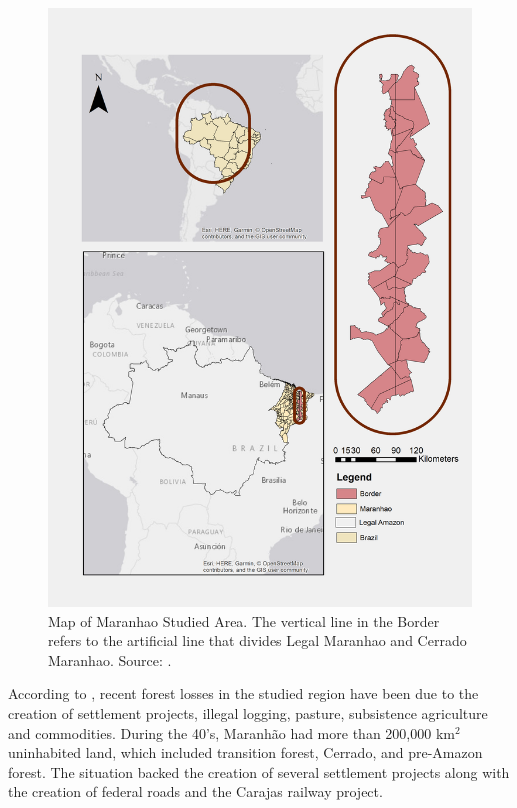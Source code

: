 \begin{figure}[H]
  \centering
  \includegraphics[width=1\textwidth, inner]{Chapter3/MaranhaoChapter3_Fig1.png}
\caption[Map of Maranhao Studied Area]{Map of Maranhao Studied Area. The vertical line in the Border refers to the artificial line that divides Legal Maranhao and Cerrado Maranhao. Source: \citep{MMMAwebsite,nugeo_2018}.}
\label{fig:delimitacao}
\end{figure}

According to \citet{ferreira_2008, CELENTANO_2017, costa_2018}, recent forest losses in the studied region have been due to the creation of settlement projects, illegal logging, pasture, subsistence agriculture and commodities. During the 40's, Maranhão had more than 200,000 km$^{2}$ uninhabited land, which included transition forest, Cerrado, and pre-Amazon forest. The situation backed the creation of several settlement projects along with the creation of federal roads and the Carajas railway project.

